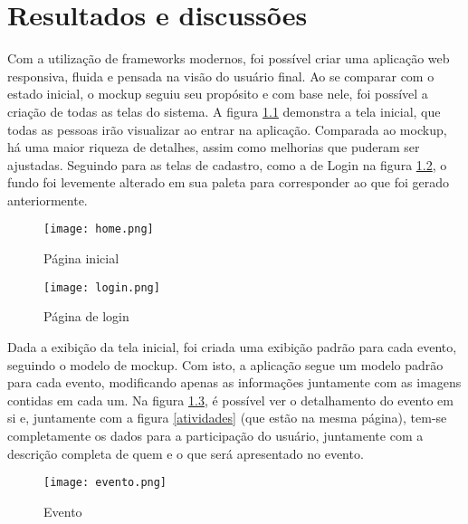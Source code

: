 \chapter{Resultados e discussões}\label{chp:LABEL_CHP_5}
\label{resultados}
Com a utilização de frameworks modernos, foi possível criar uma aplicação web responsiva, fluida e pensada na visão do usuário final. Ao se comparar com o estado inicial, o mockup seguiu seu propósito e com base nele, foi possível a criação de todas as telas do sistema. A figura \ref{home} demonstra a tela inicial, que todas as pessoas irão visualizar ao entrar na aplicação. Comparada ao mockup, há uma maior riqueza de detalhes, assim como melhorias que puderam ser ajustadas. Seguindo para as telas de cadastro, como a de Login na figura \ref{login}, o fundo foi levemente alterado em sua paleta para corresponder ao que foi gerado anteriormente. \\
\begin{figure}[h]
    \caption{\label{home}Página inicial}
    \vspace{5pt}
    \centering
    \texttt{[image: home.png]}
    \vspace{5pt}
\end{figure}
\begin{figure}[h]
    \caption{\label{login}Página de login}
    \vspace{5pt}
    \centering
    \texttt{[image: login.png]}
    \vspace{5pt}
\end{figure}
Dada a exibição da tela inicial, foi criada uma exibição padrão para cada evento, seguindo o modelo de mockup. Com isto, a aplicação segue um modelo padrão para cada evento, modificando apenas as informações juntamente com as imagens contidas em cada um. Na figura \ref{evento}, é possível ver o detalhamento do evento em si e, juntamente com a figura \ref{atividades} (que estão na mesma página), tem-se completamente os dados para a participação do usuário, juntamente com a descrição completa de quem e o que será apresentado no evento. \\
\begin{figure}[h]
    \caption{\label{evento}Evento}
    \vspace{5pt}
    \centering
    \texttt{[image: evento.png]}
    \vspace{5pt}
\end{figure}

